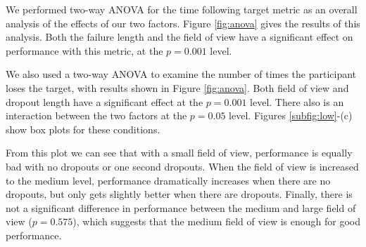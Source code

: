 \documentclass{acmsiggraph}                     %
\begin{document}


We performed two-way {ANOVA} for the time following target metric as an overall analysis of the effects of our two factors.  Figure \ref{fig:anova} gives the results of this analysis.  Both the failure length and the field of view have a significant effect on performance with this metric, at the $p=0.001$ level.

We also used a two-way {ANOVA} to examine the number of times the participant loses the target, with results shown in Figure \ref{fig:anova}.  Both field of view and dropout length have a significant effect at the $p=0.001$ level.  There also is an interaction between the two factors at the $p=0.05$ level.  Figures \ref{subfig:low}-(c) show box plots for these conditions.  

From this plot we can see that with a small field of view, performance is equally bad with no dropouts or one second dropouts.  
When the field of view is increased to the medium level, performance dramatically increases when there are no dropouts, but only gets slightly better when there are dropouts.  Finally, there is not a significant difference in performance between the medium and large field of view ($p=0.575$), which suggests that the medium field of view is enough for good performance.


\end{document}
